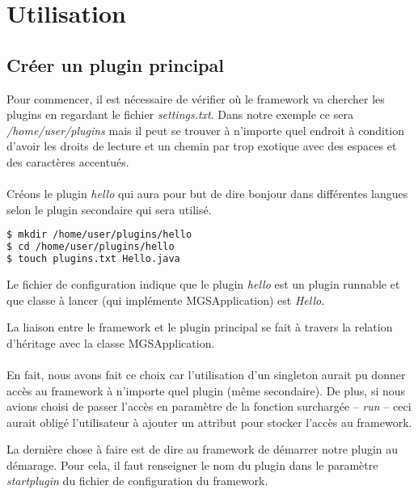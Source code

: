 \documentclass[12pt,a4paper]{article}
\begin{document}
\section{Utilisation}
\subsection{Créer un plugin principal}
Pour commencer, il est nécessaire de vérifier où le framework va chercher les 
plugins en regardant le fichier \emph{settings.txt}. Dans notre exemple ce sera 
\emph{/home/user/plugins} mais il peut se trouver à n'importe quel endroit à 
condition d'avoir les droits de lecture et un chemin par trop exotique avec des 
espaces et des caractères accentués.
\\\\
Créons le plugin \emph{hello} qui aura pour but de dire bonjour dans différentes 
langues selon le plugin secondaire qui sera utilisé.

\begin{lstlisting}[language=bash,caption=Création du plugin hello]
$ mkdir /home/user/plugins/hello
$ cd /home/user/plugins/hello
$ touch plugins.txt Hello.java
\end{lstlisting}

Le fichier de configuration indique que le plugin \emph{hello} est un plugin 
runnable et que classe à lancer (qui implémente MGSApplication) est \emph{Hello}.

\lstset{language=bash,caption=Hello plugin configuration}


La liaison entre le framework et le plugin principal se fait à travers la relation 
d'héritage avec la classe MGSApplication. 
\\\\
En fait, nous avons fait ce choix car l'utilisation d'un singleton aurait pu 
donner accès au framework à n'importe quel plugin (même secondaire). De plus, si 
nous avions choisi de passer l'accès en paramètre de la fonction surchargée -- 
\emph{run} -- ceci aurait obligé l'utilisateur à ajouter un attribut pour stocker 
l'accès au framework.

\lstset{language=java,caption=Hello plugin main class}


La dernière chose à faire est de dire au framework de démarrer notre plugin au 
démarage. Pour cela, il faut renseigner le nom du plugin dans le paramètre 
\emph{startplugin} du fichier de configuration du framework.
\end{document}
